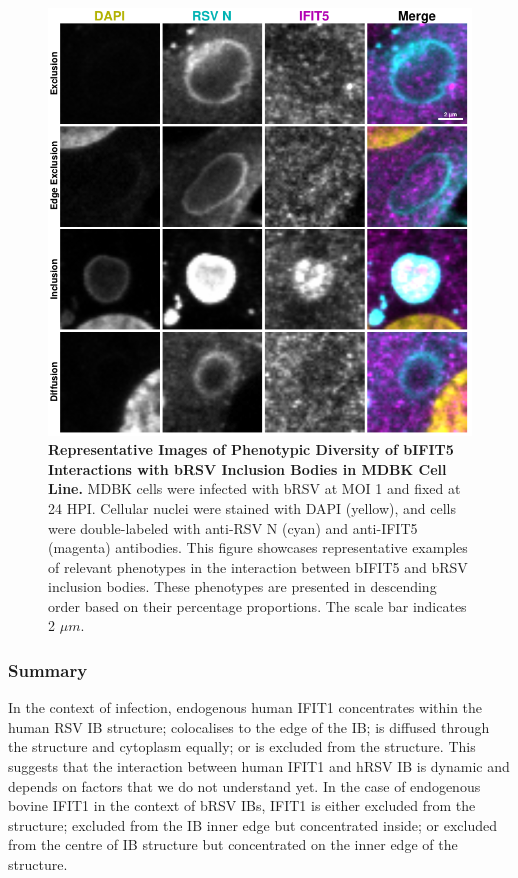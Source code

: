 \begin{figure}
    \centering
    \includegraphics[width=1\linewidth]{08. Chapter 3/Figs/02. Infection/04. IFIT5/09. mdbk i5.pdf}
    \caption[Representative Images of Phenotypic Diversity of bIFIT5 Interactions with bRSV Inclusion Bodies in MDBK Cell Line.]{\textbf{Representative Images of Phenotypic Diversity of bIFIT5 Interactions with bRSV Inclusion Bodies in MDBK Cell Line.} MDBK cells were infected with bRSV at MOI 1 and fixed at 24 HPI. Cellular nuclei were stained with DAPI (yellow), and cells were double-labeled with anti-RSV N (cyan) and anti-IFIT5 (magenta) antibodies. This figure showcases representative examples of relevant phenotypes in the interaction between bIFIT5 and bRSV inclusion bodies. These phenotypes are presented in descending order based on their percentage proportions. The scale bar indicates 2 \(\mu m\).}
    \label{fig:Representative Images of Phenotypic Diversity of bIFIT5 Interactions with bRSV Inclusion Bodies in MDBK Cell Line}
\end{figure}

\subsubsection{Summary} \label{Summary-infection}
In the context of infection, endogenous human IFIT1 concentrates within the human RSV IB structure; colocalises to the edge of the IB; is diffused through the structure and cytoplasm equally; or is excluded from the structure. This suggests that the interaction between human IFIT1 and hRSV IB is dynamic and depends on factors that we do not understand yet. In the case of endogenous bovine IFIT1 in the context of bRSV IBs, IFIT1 is either excluded from the structure; excluded from the IB inner edge but concentrated inside; or excluded from the centre of IB structure but concentrated on the inner edge of the structure. 

